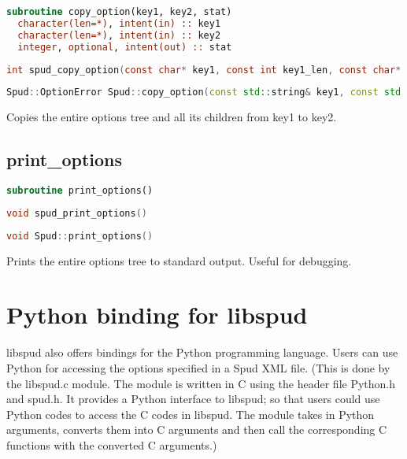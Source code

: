 \documentclass[a4paper, 11pt]{book}
\begin{document}
\begin{lstlisting}[language=fortran]
subroutine copy_option(key1, key2, stat)
  character(len=*), intent(in) :: key1
  character(len=*), intent(in) :: key2
  integer, optional, intent(out) :: stat
\end{lstlisting}

\begin{lstlisting}[language=C]
int spud_copy_option(const char* key1, const int key1_len, const char* key2, const int key2_len)
\end{lstlisting}

\begin{lstlisting}[language=C++]
Spud::OptionError Spud::copy_option(const std::string& key1, const std::string& key2)
\end{lstlisting}

Copies the entire options tree and all its children from key1 to key2.

\subsection{print\_options}

\begin{lstlisting}[language=fortran]
subroutine print_options()
\end{lstlisting}

\begin{lstlisting}[language=C]
void spud_print_options()
\end{lstlisting}

\begin{lstlisting}[language=C++]
void Spud::print_options()
\end{lstlisting}

Prints the entire options tree to standard output. Useful for debugging.

\section{Python binding for libspud}

libspud also offers bindings for the Python programming language.  Users can use Python for accessing the options specified in a Spud XML file.  (This is done by the libspud.c module.  The module is written in C using the header file Python.h and spud.h.  It provides a Python interface to libspud; so that users could use Python codes to access the C codes in libspud.  The module takes in Python arguments, converts them into C arguments and then call the corresponding C functions with the converted C arguments.) 
\end{document}
